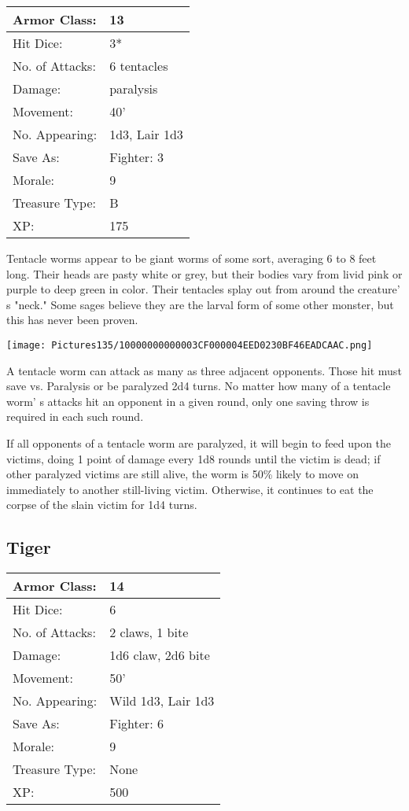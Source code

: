 \documentclass[a4paper,twoside,openany,10pt]{book}
\begin{document}
\begin{multicols}{2}
\begin{tabularx}{0.50\textwidth}{@{}lX@{}}
Armor Class: & 13 \\\hline
Hit Dice: & 3* \\\hline
No. of Attacks: & 6 tentacles \\\hline
Damage: & paralysis \\\hline
Movement: & 40' \\\hline
No. Appearing: & 1d3, Lair 1d3 \\\hline
Save As: & Fighter: 3 \\\hline
Morale: & 9 \\\hline
Treasure Type: & B \\\hline
XP: & 175 \\\hline
\end{tabularx}\medskip

Tentacle worms appear to be giant worms of some sort, averaging 6 to 8 feet long. Their heads are pasty white or grey, but their bodies vary from livid pink or purple to deep green in color. Their tentacles splay out from around the creature' s "neck." Some sages believe they are the larval form of some other monster, but this has never been proven.\medskip

\texttt{[image: Pictures135/10000000000003CF000004EED0230BF46EADCAAC.png]}

A tentacle worm can attack as many as three adjacent opponents. Those hit must save vs. Paralysis or be paralyzed 2d4 turns. No matter how many of a tentacle worm' s attacks hit an opponent in a given round, only one saving throw is required in each such round.

If all opponents of a tentacle worm are paralyzed, it will begin to feed upon the victims, doing 1 point of damage every 1d8 rounds until the victim is dead; if other paralyzed victims are still alive, the worm is 50\% likely to move on immediately to another still-living victim. Otherwise, it continues to eat the corpse of the slain victim for 1d4 turns.

\subsection*{Tiger}\label{tiger}

\begin{tabularx}{0.50\textwidth}{@{}lX@{}}
Armor Class: & 14 \\\hline
Hit Dice: & 6 \\\hline
No. of Attacks: & 2 claws, 1 bite \\\hline
Damage: & 1d6 claw, 2d6 bite \\\hline
Movement: & 50' \\\hline
No. Appearing: & Wild 1d3, Lair 1d3 \\\hline
Save As: & Fighter: 6 \\\hline
Morale: & 9 \\\hline
Treasure Type: & None \\\hline
XP: & 500 \\\hline
\end{tabularx}\medskip



\end{multicols}
\end{document}
